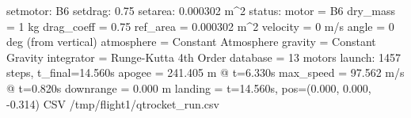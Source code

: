 \begin{console}
\ok setmotor: B6
\ok setdrag: 0.75
\ok setarea: 0.000302 m^2
\ok status:
  motor      = B6
  dry_mass   = 1 kg
  drag_coeff = 0.75
  ref_area   = 0.000302 m^2
  velocity   = 0 m/s
  angle      = 0 deg (from vertical)
  atmosphere = Constant Atmosphere
  gravity    = Constant Gravity
  integrator = Runge-Kutta 4th Order
  database   = 13 motors
\ok launch: 1457 steps, t_final=14.560s
  apogee    = 241.405 m @ t=6.330s
  max_speed = 97.562 m/s @ t=0.820s
  downrange = 0.000 m
  landing   = t=14.560s, pos=(0.000, 0.000, -0.314)
CSV /tmp/flight1/qtrocket_run.csv
\end{console}
